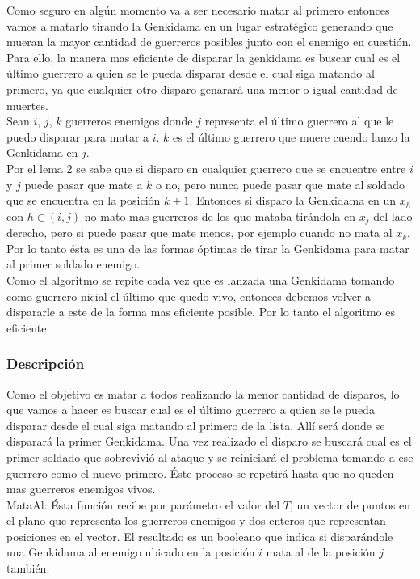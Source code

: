 		Como seguro en algún momento va a ser necesario matar al primero entonces vamos a matarlo tirando la Genkidama en un lugar estratégico generando que mueran la mayor cantidad de guerreros posibles junto con el enemigo en cuestión. Para ello, la manera mas eficiente de disparar la genkidama es buscar cual es el último guerrero a quien se le pueda disparar desde el cual siga matando al primero, ya que cualquier otro disparo genarará una menor o igual cantidad de muertes.\\
		Sean $i$, $j$, $k$ guerreros enemigos donde $j$ representa el último guerrero al que le puedo disparar para matar a $i$. $k$ es el último guerrero que muere cuendo lanzo la Genkidama en $j$.\\
		Por el lema 2 se sabe que si disparo en cualquier guerrero que se encuentre entre $i$ y $j$ puede pasar que mate a $k$ o no, pero nunca puede pasar que mate al soldado que se encuentra en la posición $k+1$. Entonces si disparo la Genkidama en un $x_{h}$ con $h \in (i, j)$ no mato mas guerreros de los que mataba tirándola en $x_{j}$ del lado derecho, pero si puede pasar que mate menos, por ejemplo cuando no mata al $x_{k}$.\\
		Por lo tanto ésta es una de las formas óptimas de tirar la Genkidama para matar al primer soldado enemigo.\\
		Como el algoritmo se repite cada vez que es lanzada una Genkidama tomando como guerrero nicial el último que quedo vivo, entonces debemos volver a dispararle a este de la forma mas eficiente posible. Por lo tanto el algoritmo es eficiente.  \\

		\subsubsection*{Descripción}
		 
	   	Como el objetivo es matar a todos realizando la menor cantidad de disparos, lo que vamos a hacer es buscar cual es el último guerrero a quien se le pueda disparar desde el cual siga matando al primero de la lista. Allí será donde se disparará la primer Genkidama. Una vez realizado el disparo se buscará cual es el primer soldado que sobrevivió al ataque y se reiniciará el problema tomando a ese guerrero como el nuevo primero. Éste proceso se repetirá hasta que no queden mas guerreros enemigos vivos. \\

		
		MataAl:
		Ésta función recibe por parámetro el valor del $T$,  un vector de puntos en el plano que representa los guerreros enemigos y dos enteros que representan posiciones en el vector.  El resultado es un booleano que indica si disparándole una Genkidama al enemigo ubicado en la posición $i$ mata al de la posición $j$ también.\\

